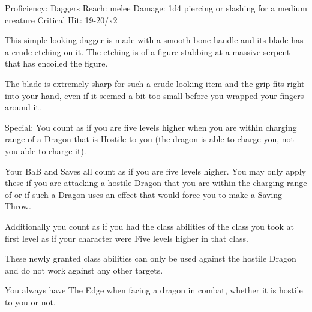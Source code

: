 Proficiency: Daggers
Reach: melee
Damage: 1d4 piercing or slashing for a medium creature
Critical Hit: 19-20/x2

This simple looking dagger is made with a smooth bone handle and its blade has a crude etching on it. The etching is of a figure stabbing at a massive serpent that has encoiled the figure.

The blade is extremely sharp for such a crude looking item and the grip fits right into your hand, even if it seemed a bit too small before you wrapped your fingers around it.

Special: You count as if you are five levels higher when you are within charging range of a Dragon that is Hostile to you (the dragon is able to charge you, not you able to charge it).

Your BaB and Saves all count as if you are five levels higher. You may only apply these if you are attacking a hostile Dragon that you are within the charging range of or if such a Dragon uses an effect that would force you to make a Saving Throw.

Additionally you count as if you had the class abilities of the class you took at first level as if your character were Five levels higher in that class.

These newly granted class abilities can only be used against the hostile Dragon and do not work against any other targets.

You always have The Edge when facing a dragon in combat, whether it is hostile to you or not.
